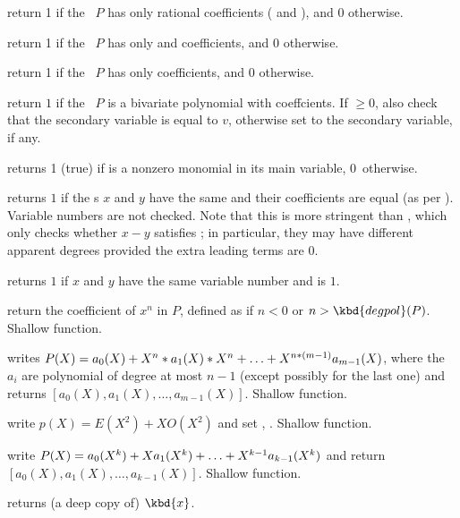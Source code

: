  return 1 if the ~$P$ has only
rational coefficients ( and ), and 0 otherwise.

 return 1 if the ~$P$ has only
 and  coefficients, and 0 otherwise.

 return 1 if the ~$P$ has only
 coefficients, and 0 otherwise.

 return $1$ if the ~$P$ is
a bivariate polynomial with  coeffcients. If $\geq 0$, also
check that the secondary variable is equal to $v$, otherwise set  to
the secondary variable, if any.

 returns 1 (true) if  is a nonzero
monomial in its main variable, 0~otherwise.

 returns $1$ if the s $x$ and $y$
have the same  and their coefficients are equal (as per
). Variable numbers are not checked. Note that this is more
stringent than , which only checks whether $x - y$ satisfies
; in particular, they may have different apparent degrees provided
the extra leading terms are $0$.

 returns $1$ if $x$ and $y$
have the same variable number and  is $1$.


 return the coefficient of $x^n$ in $P$,
defined as  if $n < 0$ or $n > \kbd{degpol}(P)$. Shallow
function.

 writes
$P(X)=a_0(X)+X^n*a_1(X)*X^n+\ldots+X^{n*(m-1)}\*a_{m-1}(X)$,
where the $a_i$ are polynomial of degree at most $n-1$
(except possibly for the last one) and returns
$[a_0(X),a_1(X),\ldots,a_{m-1}(X)]$.  Shallow function.

 write $p(X) = E(X^2) +
X O(X^2)$ and set , .  Shallow function.

 write
$P(X)=a_0(X^k)+X\*a_1(X^k)+\ldots+X^{k-1}\*a_{k-1}(X^k)$ and return
$[a_0(X),a_1(X),\ldots,a_{k-1}(X)]$.  Shallow function.

 returns (a deep copy of) $\kbd{x}$.

